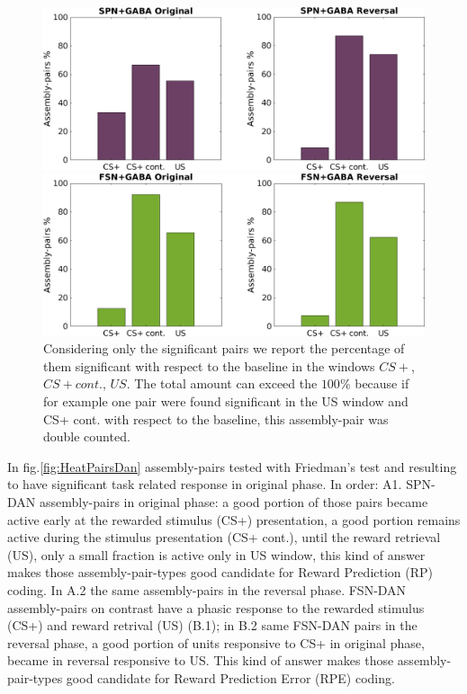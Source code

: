 \begin{figure}
    \centering
    \includegraphics[scale=0.4]{figures/SPN_GABAHisto.png}
    
    \vspace{1cm}
    
    \includegraphics[scale=0.4]{figures/FSN_GABAHisto.png}
    \caption{Considering only the significant pairs we report the percentage of them significant with respect to the baseline in the windows $CS+$, $CS+ cont.$, $US$. The total amount can exceed the $100\%$ because if for example one pair were found significant in the US window and CS+ cont. with respect to the baseline, this assembly-pair was double counted.}
    \label{fig:FriedHistoGABA}
\end{figure}
In fig.\ref{fig:HeatPairsDan} assembly-pairs tested with Friedman's test and resulting to have significant task related response in original phase. In order: A1. SPN-DAN assembly-pairs in original phase: a good portion of those pairs became active early at the rewarded stimulus (CS+) presentation, a good portion remains active during the stimulus presentation (CS+ cont.), until the reward retrieval (US), only a small fraction is active only in US window, this kind of answer makes those assembly-pair-types good candidate for Reward Prediction (RP) coding. In A.2 the same assembly-pairs in the reversal phase. FSN-DAN assembly-pairs on contrast have a phasic response to the rewarded stimulus (CS+) and reward retrival (US) (B.1); in B.2 same FSN-DAN pairs in the reversal phase, a good portion of units responsive to CS+ in original phase, became in reversal responsive to US. This kind of answer makes those assembly-pair-types good candidate for Reward Prediction Error (RPE) coding.
